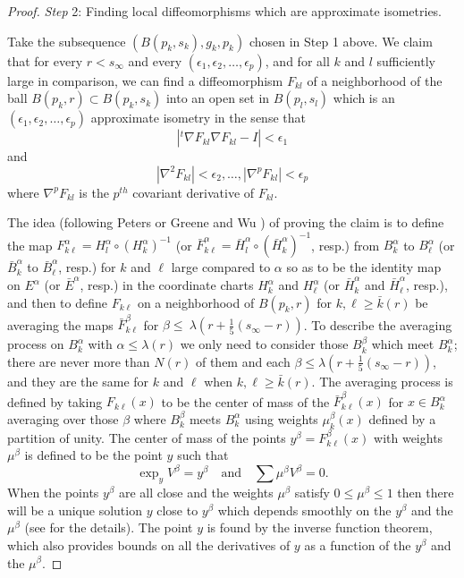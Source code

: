 \begin{proof}
\medskip
{\it Step} 2: Finding local diffeomorphisms which are approximate
isometries.

\smallskip
Take the subsequence $(B(p_k, s_k), g_k, p_k)$ chosen in Step 1
above. We claim that for every $r < s_{\infty}$ and every
$(\epsilon_1,\epsilon_2,\ldots,\epsilon_p)$, and for all $k$ and
$l$ sufficiently large in comparison, we can find a diffeomorphism
$F_{kl}$ of a neighborhood of the ball $B(p_k, r)\subset B(p_k,
s_k)$ into an open set in $B(p_l, s_l)$ which is an
$(\epsilon_1,\epsilon_2,\ldots,\epsilon_p)$ approximate isometry
in the sense that
$$
|^{t}\nabla F_{kl} \nabla F_{kl}-I|<\epsilon_1
$$
and
$$
|\nabla^2F_{kl}|<\epsilon_2,\ldots, |\nabla^pF_{kl}|<\epsilon_p
$$
where $\nabla^pF_{kl}$ is the $p^{th}$ covariant derivative of
$F_{kl}$.

The idea (following Peters \cite{Pe} or Greene and Wu \cite{Gre})
of proving the claim is to define the map $F^\alpha_{k
\ell}=H^{\alpha}_l\circ(H^{\alpha}_k)^{-1}$ (or $\bar{F}^\alpha_{k
\ell}=\bar{H}^{\alpha}_l\circ(\bar{H}^{\alpha}_k)^{-1}$, resp.)
from $B^\alpha_k$ to $B^\alpha_\ell$ (or $\bar{B}^\alpha_k$ to
$\bar{B}^\alpha_\ell$, resp.) for $k$ and $\ell$ large compared to
$\alpha$ so as to be the identity map on ${E}^\alpha$ (or
$\bar{E}^\alpha$, resp.) in the coordinate charts $H^\alpha_k$ and
$H^\alpha_\ell$ (or $\bar{H}^\alpha_k$ and $\bar{H}^\alpha_\ell$,
resp.), and then to define $F_{k \ell}$ on a neighborhood of
$B(p_k,r)$ for $k, \ell \geq \bar{k}(r)$ be averaging the maps
$\bar{F}^\beta_{k \ell}$ for $\beta \leq \
\lambda(r+\frac{1}{5}(s_{\infty}-r))$. To describe the averaging
process on $B^\alpha_k$ with $\alpha \leq \lambda(r)$ we only need
to consider those $B^\beta_k$ which meet $B^\alpha_k$; there are
never more than $N(r)$ of them and each $\beta \leq
\lambda(r+\frac{1}{5}(s_{\infty}-r))$, and they are the same for
$k$ and $\ell$ when $k, \ell \geq \bar{k}(r)$. The averaging
process is defined by taking $F_{k \ell}(x)$ to be the center of
mass of the $\bar{F}^\beta_{k \ell}(x)$ for $x \in B^\alpha_k$
averaging over those $\beta$ where $B^\beta_k$ meets $B^\alpha_k$
using weights $\mu^\beta_k(x)$ defined by a partition of unity.
The center of mass of the points $y^\beta=F^\beta_{k \ell}(x)$
with weights $\mu^\beta$ is defined to be the point $y$ such that
$$
\exp_yV^\beta = y^\beta \quad \text{and} \quad \sum \mu^\beta
V^\beta=0.
$$
When the points $y^\beta$ are all close and the weights
$\mu^\beta$ satisfy $0 \leq \mu^\beta \leq 1$ then there will be a
unique solution $y$ close to $y^\beta$ which depends smoothly on
the $y^\beta$ and the $\mu^\beta$ (see \cite{Gre} for the
details). The point $y$ is found by the inverse function theorem,
which also provides bounds on all the derivatives of $y$ as a
function of the $y^\beta$ and the $\mu^\beta$.


\end{proof}

